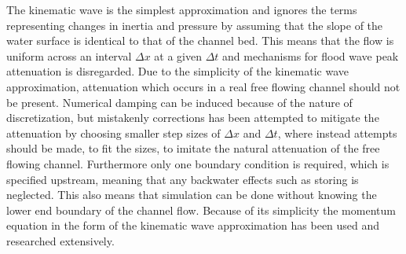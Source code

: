 The kinematic wave is the simplest approximation and ignores the terms representing changes in inertia and pressure by assuming that the slope of the water surface is identical to that of the channel bed. 
This means that the flow is uniform across an interval $\Delta x$ at a given $\Delta t$ and mechanisms for flood wave peak attenuation is disregarded. Due to the simplicity of the kinematic wave approximation, attenuation which occurs in a real free flowing channel should not be present. Numerical damping can be induced because of the nature of discretization, but mistakenly corrections has been attempted to mitigate the attenuation by choosing smaller step sizes of $\Delta x$ and $\Delta t$, where instead attempts should be made, to fit the sizes, to imitate the natural attenuation of the free flowing channel.     
Furthermore only one boundary condition is required, which is specified upstream, meaning that any backwater effects such as storing is neglected. This also means that simulation can be done without knowing the lower end boundary of the channel flow. Because of its simplicity the momentum equation in the form of the kinematic wave approximation has been used and researched extensively\cite{stormwatercollectionsystems}.  












